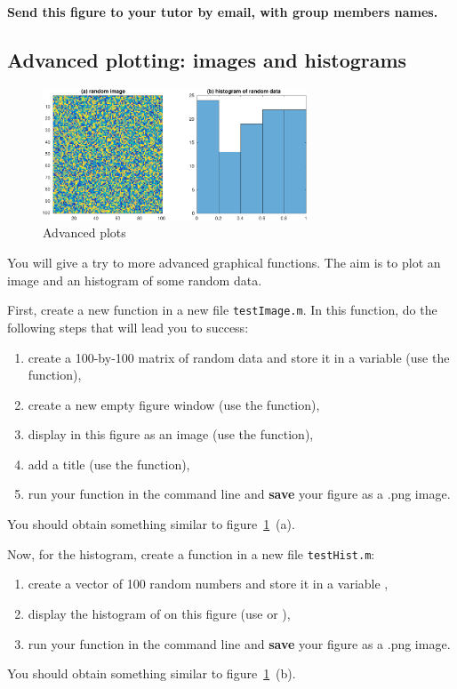 \documentclass{article}
\begin{document}
\textbf{Send this figure to your tutor by email, with group members names.}


\subsection{Advanced plotting: images and histograms}

\begin{figure}
  \centering
  \includegraphics[width=0.7\textwidth]{advancedplot.pdf}
  \caption{Advanced plots}\label{fig:adv}
\end{figure}

You will give a try to more advanced graphical functions.
The aim is to plot an image and an histogram of some random data.

First, create a new function  in a new file \verb|testImage.m|.
In this function, do the following steps that will lead you to success:
\begin{enumerate}
  \item create a 100-by-100 matrix of random data and store it in a variable  (use the  function),
  \item create a new empty figure window (use the  function),
  \item display in this figure  as an image (use the  function),
  \item add a title (use the  function),
  \item run your function in the command line and \textbf{save} your figure as a .png image.
\end{enumerate}
You should obtain something similar to figure~\ref{fig:adv}~(a).

Now, for the histogram, create a  function in a new file \verb|testHist.m|:
\begin{enumerate}
  \item create a vector of 100 random numbers and store it in a variable ,
  \item display the histogram of  on this figure (use  or ),
  \item run your function in the command line and \textbf{save} your figure as a .png image.
\end{enumerate}
You should obtain something similar to figure~\ref{fig:adv}~(b).
\end{document}
